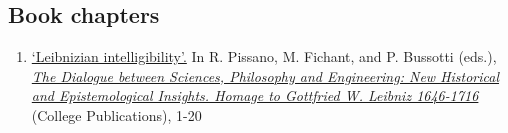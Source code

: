 \subsection{Book chapters}
\begin{enumerate}
	\setcounter{enumi}{\value{publicationCounter}}	%
\item {}
{}
{
	\href{https://www.academia.edu/14265939/Leibnizian_intelligibility}{`Leibnizian intelligibility'.} In R. Pissano, M. Fichant, and P. Bussotti (eds.), \href{http://collegepublications.co.uk/dialogues/?00005}{\emph{The Dialogue between Sciences, Philosophy and Engineering: New Historical and Epistemological Insights. Homage to Gottfried W. Leibniz 1646-1716}} (College Publications), 1-20}
{}
	\setcounter{publicationCounter}{\value{enumi}}	%
\end{enumerate}
